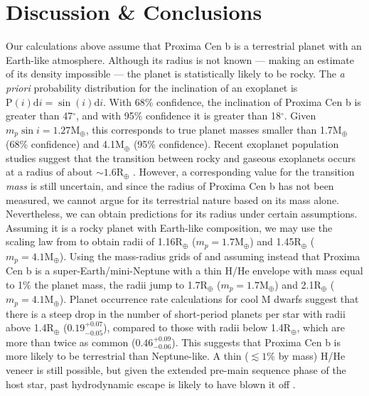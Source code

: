 \documentclass{emulateapj}
\newcommand{\XXX}[1]{#1}      %
\begin{document}
\section{Discussion \& Conclusions}
\label{sec:disc}
\XXX{Our calculations above assume that Proxima Cen b is a terrestrial planet with an Earth-like atmosphere. Although its radius is not known --- making an estimate of its density impossible --- the planet is statistically likely to be rocky. The \emph{a priori} probability distribution for the inclination of an exoplanet is $\mathrm{P}(i)\mathrm{d}i = \sin(i)\mathrm{d}i$. With 68\% confidence, the inclination of Proxima Cen b is greater than 47$^\circ$, and with 95\% confidence it is greater than 18$^\circ$. Given $m_p\sin i = 1.27\mathrm{M}_\oplus$, this corresponds to true planet masses smaller than 1.7M$_\oplus$ (68\% confidence) and 4.1M$_\oplus$ (95\% confidence). Recent exoplanet population studies suggest that the transition between rocky and gaseous exoplanets occurs at a radius of about ${\sim}1.6\mathrm{R}_\oplus$ \citep{Rogers2015, Wolfgang2015}. However, a corresponding value for the transition \emph{mass} is still uncertain, and since the radius of Proxima Cen b has not been measured, we cannot argue for its terrestrial nature based on its mass alone. Nevertheless, we can obtain predictions for its radius under certain assumptions. Assuming it is a rocky planet with Earth-like composition, we may use the scaling law from \citet{Fortney2007} to obtain radii of 1.16R$_\oplus$ ($m_p = 1.7\mathrm{M}_\oplus$) and 1.45R$_\oplus$ ($m_p = 4.1\mathrm{M}_\oplus$).
Using the mass-radius grids of \citet{Lopez2012} and assuming instead that Proxima Cen b is a super-Earth/mini-Neptune with a thin H/He envelope with mass equal to 1\% the planet mass, the radii jump to 1.7R$_\oplus$ ($m_p = 1.7\mathrm{M}_\oplus$) and 2.1R$_\oplus$ ($m_p = 4.1\mathrm{M}_\oplus$).
Planet occurrence rate calculations for cool M dwarfs \citep{Dressing2013} suggest that there is a steep drop in the number of short-period planets per star with radii above 1.4R$_\oplus$ ($0.19^{+0.07}_{-0.05}$), compared to those with radii below 1.4R$_\oplus$, which are more than twice as common ($0.46^{+0.09}_{-0.06}$). This suggests that Proxima Cen b is more likely to be terrestrial than Neptune-like. A thin ($\lesssim 1\%$ by mass) H/He veneer is still possible, but given the extended pre-main sequence phase of the host star, past hydrodynamic escape is likely to have blown it off \citep{Luger2015, Barnes2016}.}
\end{document}
